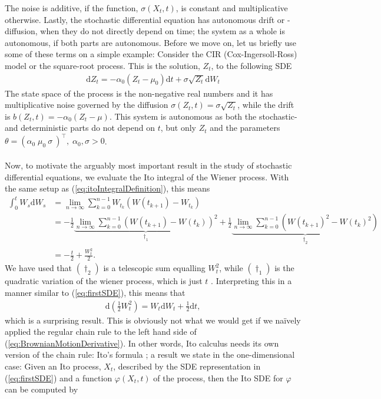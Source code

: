 The noise is additive, if the function, $\sigma(X_t, t)$, is constant and multiplicative otherwise. Lastly, the stochastic differential equation has autonomous drift or -diffusion, when they do not directly depend on time; the system as a whole is autonomous, if both parts are autonomous. Before we move on, let us briefly use some of these terms on a simple example: Consider the CIR (Cox-Ingersoll-Ross) model or the square-root process. This is the solution, $Z_t$, to the following SDE
\begin{align}
    \mathrm{d}Z_t = -\alpha_0\left(Z_t - \mu_0\right)\mathrm{d}t + \sigma\sqrt{Z_t}\mathrm{d}W_t \label{eq:CIR_process}
\end{align}
The state space of the process is the non-negative real numbers and it has multiplicative noise governed by the diffusion $\sigma\left(Z_t, t\right) = \sigma\sqrt{Z_t}$, while the drift is $b(Z_t, t) = -\alpha_0\left(Z_t - \mu\right)$. This system is autonomous as both the stochastic- and deterministic parts do not depend on $t$, but only $Z_t$ and the parameters  $\theta = \left(\alpha_0\; \mu_0\: \sigma\:\right)^\top,\; \alpha_0, \sigma>0$.\\\\
Now, to motivate the arguably most important result in the study of stochastic differential equations, we evaluate the Ito integral of the Wiener process. With the same setup as (\ref{eq:itoIntegralDefinition}), this means
\begin{align}
    \int_0^t W_s \mathrm{d}W_s & = \lim_{n \to \infty}\sum_{k = 0}^{n-1} W_{t_k}\left(W(t_{k + 1}) - W_{t_k}\right) \nonumber \\ 
    & = - \frac{1}{2}\underbrace{\lim_{n \to \infty}\sum_{k = 0}^{n-1} \left(W(t_{k + 1}) - W(t_{k})\right)^2}_{\dagger_1}  + \frac{1}{2}\underbrace{\lim_{n \to \infty}\sum_{k = 0}^{n-1}\left(W(t_{k + 1})^2 - W(t_{k})^2\right)}_{\dagger_2} \nonumber \\
    & = -\frac{t}{2} + \frac{W_t^2}{2}.
\end{align}
We have used that $(\dagger_2)$ is a telescopic sum equalling $W_t^2$, while $(\dagger_1)$ is the quadratic variation of the wiener process, which is just $t$ \cite[theorem 11.34]{Hansen2022}. Interpreting this in a manner similar to (\ref{eq:firstSDE}), this means that
\begin{align}
    \mathrm{d}\left(\frac{1}{2}W_t^2\right) = W_t\mathrm{d}W_t + \frac{1}{2}\mathrm{d}t, \label{eq:BrownianMotionDerivative}
\end{align}
which is a surprising result. This is obviously not what we would get if we naïvely applied the regular chain rule to the left hand side of (\ref{eq:BrownianMotionDerivative}). In other words, Ito calculus needs its own version of the chain rule: Ito's formula \cite[Theorem 4.2]{Srkk2019}; a result we state in the one-dimensional case:  Given an Ito process, $X_t$, described by the SDE representation in (\ref{eq:firstSDE}) and a function $\varphi(X_t, t)$ of the process, then the Ito SDE for $\varphi$ can be computed by
